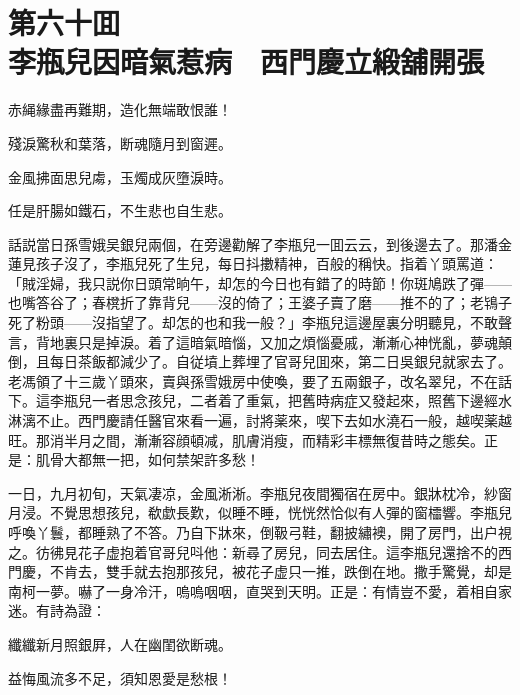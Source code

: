 
\chapter*{第六十囬　\\李瓶兒因暗氣惹病　西門慶立緞舖開張}


\begin{myquote}
赤䋲緣盡再難期，造化無端敢恨誰！

殘淚驚秋和葉落，断魂隨月到窗遲。

金風拂面思兒䖏，玉燭成灰墮淚時。

任是肝腸如鐵石，不生悲也自生悲。
\end{myquote}

話説當日孫雪娥吴銀兒兩個，在旁邊勸解了李瓶兒一囬云云，到後邊去了。那潘金蓮見孩子沒了，李瓶兒死了生兒，每日抖擻精神，百般的稱快。指着丫頭罵道：「賊淫婦，我只説你日頭常晌午，却怎的今日也有錯了的時節！你斑鳩跌了彈——也嘴答谷了；春櫈折了靠背兒——沒的倚了；王婆子賣了磨——推不的了；老鴇子死了粉頭——沒指望了。却怎的也和我一般？」李瓶兒這邊屋裏分明聽見，不敢聲言，背地裏只是掉淚。着了這暗氣暗惱，又加之煩惱憂戚，漸漸心神恍亂，夢魂顛倒，且每日茶飯都減少了。自従墳上葬埋了官哥兒囬來，第二日吳銀兒就家去了。老馮領了十三歲丫頭來，賣與孫雪娥房中使喚，要了五兩銀子，改名翠兒，不在話下。這李瓶兒一者思念孩兒，二者着了重氣，把舊時病症又發起來，照舊下邊經水淋漓不止。西門慶請任醫官來看一遍，討將薬來，喫下去如水澆石一般，越喫薬越旺。那消半月之間，漸漸容顔頓减，肌膚消瘦，而精彩丰標無復昔時之態矣。正是：肌骨大都無一把，如何禁架許多愁！

一日，九月初旬，天氣凄凉，金風淅淅。李瓶兒夜間獨宿在房中。銀牀枕冷，紗窗月浸。不覺思想孩兒，欷歔長歎，似睡不睡，恍恍然恰似有人彈的窗櫺響。李瓶兒呼喚丫鬟，都睡熟了不答。乃自下牀來，倒靸弓鞋，翻披繡襖，開了房門，出户視之。彷彿見花子虚抱着官哥兒呌他：新尋了房兒，同去居住。這李瓶兒還捨不的西門慶，不肯去，雙手就去抱那孩兒，被花子虚只一推，跌倒在地。撒手驚覺，却是南柯一夢。嚇了一身冷汗，嗚嗚咽咽，直哭到天明。正是：有情豈不愛，着相自家迷。有詩為證：

\begin{myquote}
纖纖新月照銀屛，人在幽閨欲断魂。

益悔風流多不足，須知恩愛是愁根！
\end{myquote}

